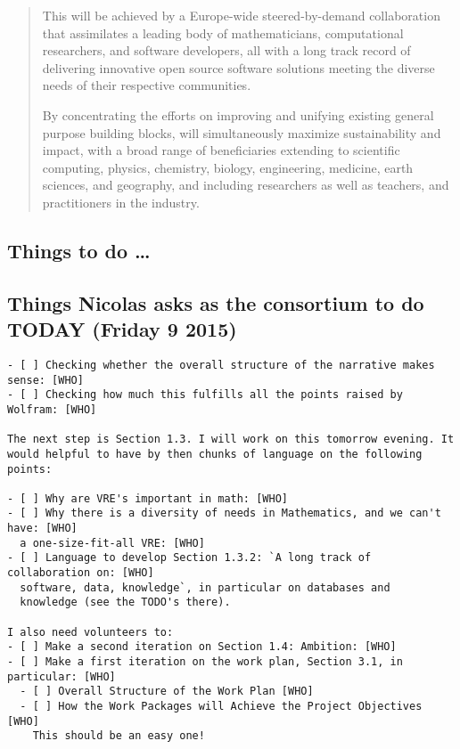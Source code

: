 \documentclass[noworkareas,deliverables,\classoptions]{euproposal}       %
\begin{document}
\begin{proposal}
\begin{abstract}
  This will be achieved by a Europe-wide steered-by-demand
  collaboration that assimilates a leading body of mathematicians,
  computational researchers, and software developers, all with a long
  track record of delivering innovative open source software solutions
  meeting the diverse needs of their respective communities.

  By concentrating the efforts on improving and unifying existing
  general purpose building blocks, \TheProject will simultaneously
  maximize sustainability and impact, with a broad range of
  beneficiaries extending to scientific computing, physics, chemistry,
  biology, engineering, medicine, earth sciences, and geography, and
  including researchers as well as teachers, and practitioners in the
  industry.

\end{abstract}
\ifsubmit\else\setcounter{tocdepth}{4}\fi
\tableofcontents



\begin{draft}
\section*{Things to do \dots}
\subsection*{Things Nicolas asks as the consortium to do TODAY (Friday 9 2015)}
\begin{verbatim}
- [ ] Checking whether the overall structure of the narrative makes sense: [WHO]
- [ ] Checking how much this fulfills all the points raised by Wolfram: [WHO]

The next step is Section 1.3. I will work on this tomorrow evening. It
would helpful to have by then chunks of language on the following points:

- [ ] Why are VRE's important in math: [WHO]
- [ ] Why there is a diversity of needs in Mathematics, and we can't have: [WHO]
  a one-size-fit-all VRE: [WHO]
- [ ] Language to develop Section 1.3.2: `A long track of collaboration on: [WHO]
  software, data, knowledge`, in particular on databases and
  knowledge (see the TODO's there).

I also need volunteers to:
- [ ] Make a second iteration on Section 1.4: Ambition: [WHO]
- [ ] Make a first iteration on the work plan, Section 3.1, in particular: [WHO]
  - [ ] Overall Structure of the Work Plan [WHO]
  - [ ] How the Work Packages will Achieve the Project Objectives [WHO]
    This should be an easy one!


\end{verbatim}
\end{draft}
\end{proposal}
\end{document}
